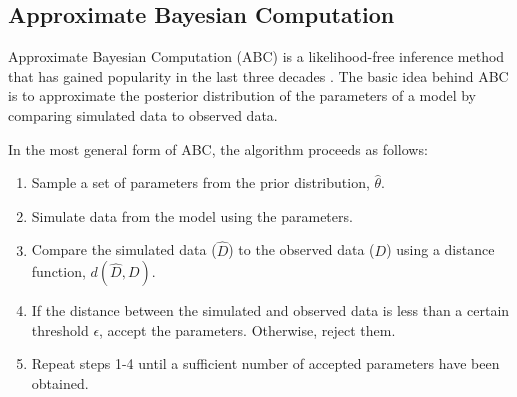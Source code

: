 \subsection{Approximate Bayesian Computation}
Approximate Bayesian Computation (ABC) is a likelihood-free inference method
that has gained popularity in the last three decades
\cite{tavare_inferring_1997, lechevallier_integrating_2010,
jagiella_parallelization_2017}. The basic idea behind ABC is to approximate the
posterior distribution of the parameters of a model by comparing simulated data
to observed data. \par
In the most general form of ABC, the algorithm proceeds
as follows:

\begin{enumerate}
    \item Sample a set of parameters from the prior distribution, $\hat\theta$.
    \item Simulate data from the model using the parameters.
    \item Compare the simulated data ($\hat D$) to the observed data ($D$)
        using a distance function, $d(\hat D, D)$.
    \item If the distance between the simulated and observed data is less than
        a certain threshold $\epsilon$, accept the
    parameters. Otherwise, reject them.
    \item Repeat steps 1-4 until a sufficient number of accepted parameters
        have been obtained.
\end{enumerate}


